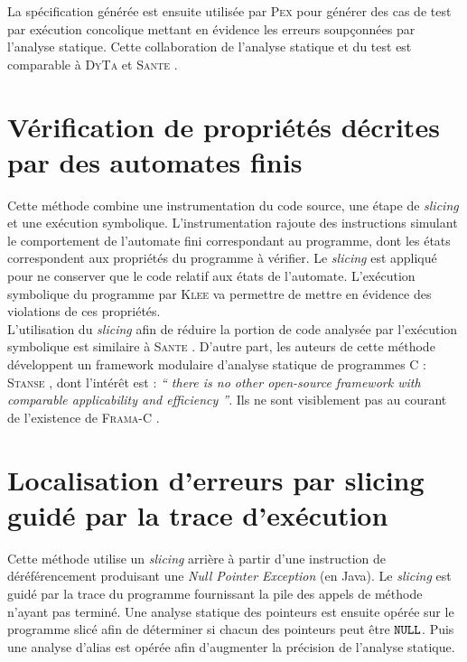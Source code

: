 La spécification générée est ensuite utilisée par \textsc{Pex} \cite{PEX}
pour générer des cas de test par exécution concolique mettant en évidence les
erreurs soupçonnées par l'analyse statique. Cette collaboration de l'analyse
statique et du test est comparable à \textsc{DyTa} \cite{DyTa} et \textsc{Sante}
\cite{SANTE}.

\section{Vérification de propriétés décrites par des automates finis}

Cette méthode \cite{checking-prop-state-machines} combine une instrumentation du
code source, une étape de {\em slicing} et une exécution symbolique.
L'instrumentation rajoute des instructions simulant le comportement de
l'automate fini correspondant au programme, dont les états correspondent aux
propriétés du programme à vérifier. Le {\em slicing} est appliqué pour ne
conserver que le code relatif aux états de l'automate. L'exécution symbolique du
programme par \textsc{Klee} \cite{KLEE} va permettre de mettre en évidence des
violations de ces propriétés.\\

L'utilisation du {\em slicing} afin de réduire la portion de code analysée par
l'exécution symbolique est similaire à \textsc{Sante} \cite{SANTE}. D'autre
part, les auteurs de cette méthode développent un framework modulaire d'analyse
statique de programmes C : \textsc{Stanse} \cite{STANSE}, dont l'intérêt est :
{\em`` there is no other open-source framework with comparable applicability and
efficiency ''}. Ils ne sont visiblement pas au courant de l'existence de
\textsc{Frama-C} \cite{Frama-C}.

\section{Localisation d'erreurs par slicing guidé par la trace d'exécution}

Cette méthode \cite{fault-localization} utilise un {\em slicing} arrière à
partir d'une instruction de déréférencement produisant une {\em Null Pointer
Exception} (en Java). Le {\em slicing} est guidé par la trace du programme
fournissant la pile des appels de méthode n'ayant pas terminé. Une analyse
statique des pointeurs est ensuite opérée sur le programme slicé afin de
déterminer si chacun des pointeurs peut être ${\tt NULL}$. Puis une analyse
d'alias est opérée afin d'augmenter la précision de l'analyse statique.\\

